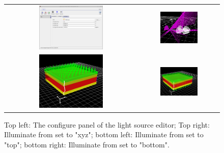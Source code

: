 \begin{figure}[H]
\centering
\begin{tabular}{ c c }

\includegraphics[width=0.5\textwidth,height=0.4\textwidth]{./images/lights2.png}

&
\includegraphics[width=0.5\textwidth,height=0.4\textwidth]{./images/light_xyz.png}
\\

\includegraphics[width=0.5\textwidth,height=0.4\textwidth]{./images/light_top.png}

&
\includegraphics[width=0.5\textwidth,height=0.4\textwidth]{./images/light_btm.png}
\\
\end{tabular}
\caption{Top left: The configure panel of the light source editor; Top right: Illuminate from set to "xyz"; bottom left: Illuminate from set to "top"; bottom right: Illuminate from set to "bottom".}
\label{fig:lightcomesfrom}
\end{figure}

\newpage




